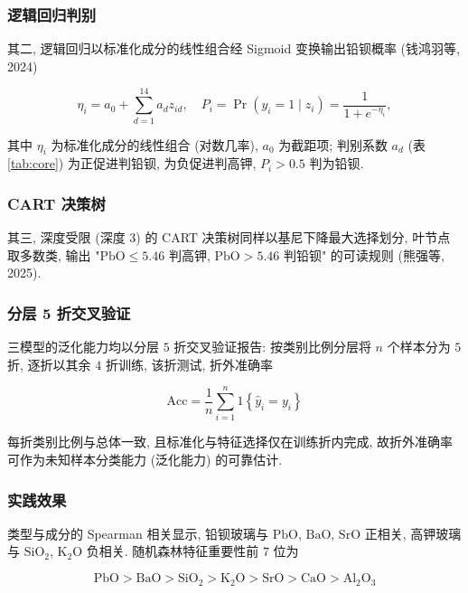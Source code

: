 \documentclass{ctexart}
\begin{document}
\subsubsection{逻辑回归判别}

其二, 逻辑回归以标准化成分的线性组合经 Sigmoid 变换输出铅钡概率 (钱鸿羽等, 2024)

\begin{equation*}
\eta_{i}=a_{0}+\sum_{d=1}^{14}a_{d}z_{id},\quad{}P_{i}=\Pr\left(y_{i}=1\mid{}z_{i}\right)=\frac{1}{1+e^{-\eta_{i}}},
\end{equation*}

其中 $\eta_i$ 为标准化成分的线性组合 (对数几率), $a_0$ 为截距项; 判别系数 $a_d$ (表 \ref{tab:core}) 为正促进判铅钡, 为负促进判高钾, $P_i>0.5$ 判为铅钡.

\subsubsection{CART 决策树}

其三, 深度受限 (深度 $3$) 的 CART 决策树同样以基尼下降最大选择划分, 叶节点取多数类, 输出 "$\mathrm{PbO}\le5.46$ 判高钾, $\mathrm{PbO}>5.46$ 判铅钡" 的可读规则 (熊强等, 2025).


\subsubsection{分层 5 折交叉验证}

三模型的泛化能力均以分层 $5$ 折交叉验证报告: 按类别比例分层将 $n$ 个样本分为 $5$ 折, 逐折以其余 $4$ 折训练, 该折测试, 折外准确率

\begin{equation*}
\mathrm{Acc}=\frac{1}{n}\sum_{i=1}^{n}\mathrm{1}\left\{\widehat{y}_{i}=y_{i}\right\}
\end{equation*}

每折类别比例与总体一致, 且标准化与特征选择仅在训练折内完成, 故折外准确率可作为未知样本分类能力 (泛化能力) 的可靠估计.


\subsubsection{实践效果}

类型与成分的 Spearman 相关显示, 铅钡玻璃与 $\mathrm{PbO}$, $\mathrm{BaO}$, $\mathrm{SrO}$ 正相关, 高钾玻璃与 $\mathrm{SiO_2}$, $\mathrm{K_2O}$ 负相关. 随机森林特征重要性前 $7$ 位为

\begin{equation*}
\mathrm{PbO}>\mathrm{BaO}>\mathrm{SiO_2}>\mathrm{K_2O}>\mathrm{SrO}>\mathrm{CaO}>\mathrm{Al_2O_3}
\end{equation*}
\end{document}
